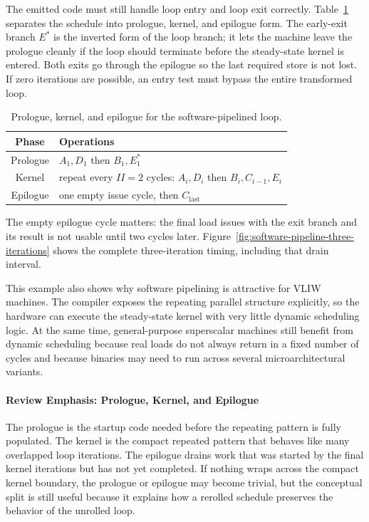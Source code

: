 The emitted code must still handle loop entry and loop exit correctly.
Table~\ref{tab:ilp-swpipe-phases} separates the schedule into prologue, kernel, and epilogue form.
The early-exit branch $E^\ast$ is the inverted form of the loop branch; it lets the machine leave the prologue cleanly if the loop should terminate before the steady-state kernel is entered.
Both exits go through the epilogue so the last required store is not lost.
If zero iterations are possible, an entry test must bypass the entire transformed loop.
\begin{table}[t]
    \centering
    \renewcommand{\arraystretch}{1.15}
    \begin{tabular}{|c|l|}
        \hline
        Phase    & Operations                                                                        \\
        \hline
        Prologue & $A_1, D_1$ \quad then \quad $B_1, E^\ast_1$                                       \\
        \hline
        Kernel   & repeat every $II=2$ cycles: \quad $A_i, D_i$ \quad then \quad $B_i, C_{i-1}, E_i$ \\
        \hline
        Epilogue & one empty issue cycle, then $C_{\text{last}}$ \\
        \hline
    \end{tabular}
    \caption{Prologue, kernel, and epilogue for the software-pipelined loop.}
    \label{tab:ilp-swpipe-phases}
\end{table}
The empty epilogue cycle matters: the final load issues with the exit branch and its result is not usable until two cycles later.
Figure~\ref{fig:software-pipeline-three-iterations} shows the complete three-iteration timing, including that drain interval.


This example also shows why software pipelining is attractive for VLIW machines.
The compiler exposes the repeating parallel structure explicitly, so the hardware can execute the steady-state kernel with very little dynamic scheduling logic.
At the same time, general-purpose superscalar machines still benefit from dynamic scheduling because real loads do not always return in a fixed number of cycles and because binaries may need to run across several microarchitectural variants.

\paragraph{Review Emphasis: Prologue, Kernel, and Epilogue}\label{par:ch7-review-prologue-kernel-epilogue}
The prologue is the startup code needed before the repeating pattern is fully populated.
The kernel is the compact repeated pattern that behaves like many overlapped loop iterations.
The epilogue drains work that was started by the final kernel iterations but has not yet completed.
If nothing wraps across the compact kernel boundary, the prologue or epilogue may become trivial, but the conceptual split is still useful because it explains how a rerolled schedule preserves the behavior of the unrolled loop.


